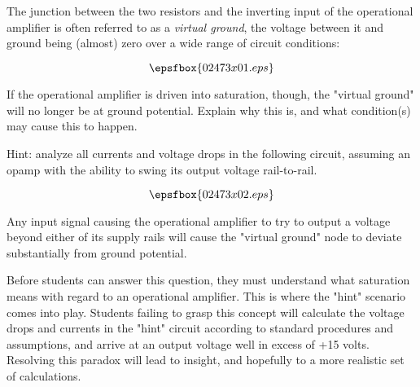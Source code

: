 

The junction between the two resistors and the inverting input of the operational amplifier is often referred to as a {\it virtual ground}, the voltage between it and ground being (almost) zero over a wide range of circuit conditions:

$$\epsfbox{02473x01.eps}$$

If the operational amplifier is driven into saturation, though, the "virtual ground" will no longer be at ground potential.  Explain why this is, and what condition(s) may cause this to happen.

Hint: analyze all currents and voltage drops in the following circuit, assuming an opamp with the ability to swing its output voltage rail-to-rail.

$$\epsfbox{02473x02.eps}$$







Any input signal causing the operational amplifier to try to output a voltage beyond either of its supply rails will cause the "virtual ground" node to deviate substantially from ground potential.







Before students can answer this question, they must understand what saturation means with regard to an operational amplifier.  This is where the "hint" scenario comes into play.  Students failing to grasp this concept will calculate the voltage drops and currents in the "hint" circuit according to standard procedures and assumptions, and arrive at an output voltage well in excess of +15 volts.  Resolving this paradox will lead to insight, and hopefully to a more realistic set of calculations.




